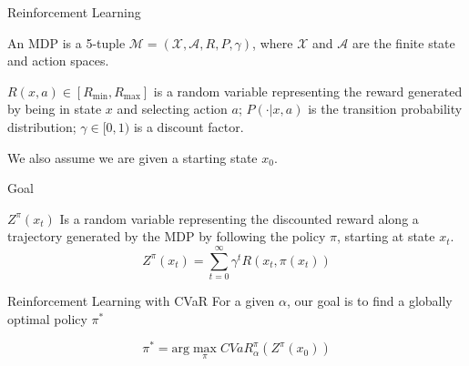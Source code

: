 \documentclass{beamer}
\begin{document}
\begin{frame}{Reinforcement Learning}

\begin{definition}
An MDP is a 5-tuple $\mathcal{M} = (\mathcal{X}, \mathcal{A}, R, P, \gamma)$, where $\mathcal{X}$ and $\mathcal{A}$ are the finite state and action spaces.

$R(x, a) \in [R_{\min}, R_{\max}]$ is a random variable representing the reward generated by being in state $x$ and selecting action $a$; $P(\cdot|x, a)$ is the transition probability distribution;
$\gamma \in [0, 1)$ is a discount factor.

We also assume we are given a starting state $x_0$.
\end{definition}
\end{frame}


\begin{frame}{Goal}

\begin{definition}
$Z^\pi(x_t)$ Is a random variable representing the discounted reward along a trajectory generated by the MDP by following the policy $\pi$, starting at state $x_t$.
$$Z^\pi(x_{t})=\sum_{t=0}^\infty \gamma^tR(x_t,\pi(x_t))$$
\end{definition}

\begin{block}{Reinforcement Learning with CVaR}
For a given $\alpha$, our goal is to find a globally optimal policy $\pi^*$

$$\pi^* = \text{arg}\max_\pi CVaR^\pi_\alpha(Z^\pi(x_0))$$
\end{block}
\end{frame}

\end{document}
